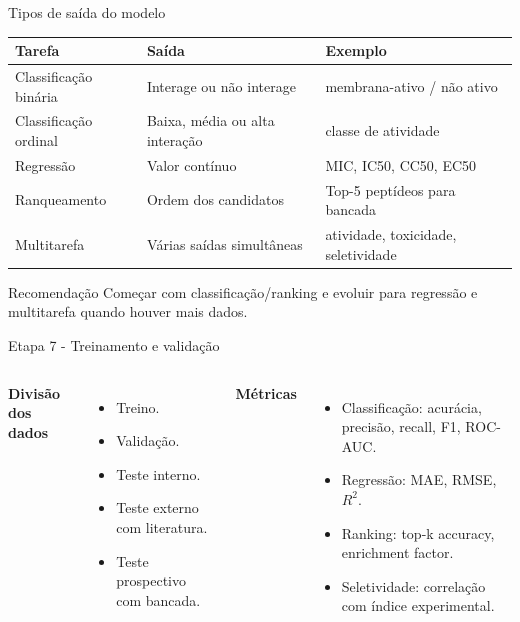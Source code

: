 \documentclass[aspectratio=169,10pt]{beamer}
\begin{document}
\begin{frame}{Tipos de saída do modelo}
\small
\begin{center}
\begin{tabular}{p{3.0cm}p{4.5cm}p{4.5cm}}
\toprule
\textbf{Tarefa} & \textbf{Saída} & \textbf{Exemplo} \\
\midrule
Classificação binária & Interage ou não interage & membrana-ativo / não ativo \\
Classificação ordinal & Baixa, média ou alta interação & classe de atividade \\
Regressão & Valor contínuo & MIC, IC50, CC50, EC50 \\
Ranqueamento & Ordem dos candidatos & Top-5 peptídeos para bancada \\
Multitarefa & Várias saídas simultâneas & atividade, toxicidade, seletividade \\
\bottomrule
\end{tabular}
\end{center}

\vspace{0.2cm}
\begin{block}{Recomendação}
Começar com classificação/ranking e evoluir para regressão e multitarefa quando houver mais dados.
\end{block}
\end{frame}

\begin{frame}{Etapa 7 - Treinamento e validação}
\begin{columns}[T]
\textbf{Divisão dos dados}
\begin{itemize}
  \item Treino.
  \item Validação.
  \item Teste interno.
  \item Teste externo com literatura.
  \item Teste prospectivo com bancada.
\end{itemize}

\textbf{Métricas}
\begin{itemize}
  \item Classificação: acurácia, precisão, recall, F1, ROC-AUC.
  \item Regressão: MAE, RMSE, $R^2$.
  \item Ranking: top-k accuracy, enrichment factor.
  \item Seletividade: correlação com índice experimental.
\end{itemize}
\end{columns}
\end{frame}
\end{document}
